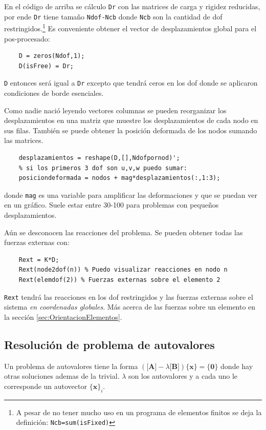 \documentclass[11pt, a4paper,titlepage]{article}
\newcommand{\Mme}[1]{\boldsymbol{[}\mathbf{#1} \boldsymbol{]}}
\newcommand{\Cme}[1]{\boldsymbol{\{ }\mathbf{#1} \boldsymbol{\}} }
\begin{document}
En el código de arriba se cálculo \texttt{Dr} con las matrices de carga y rigidez reducidas, por ende \texttt{Dr} tiene tamaño \texttt{Ndof-Ncb} donde \texttt{Ncb} son la cantidad de dof restringidos.\footnote{A pesar de no tener mucho uso en un programa de elementos finitos se deja la definición: \texttt{Ncb=sum(isFixed)}} Es conveniente obtener el vector de desplazamientos global para el pos-procesado:

\begin{verbatim}
    D = zeros(Ndof,1);
    D(isFree) = Dr;
\end{verbatim}
\texttt{D} entonces será igual a \texttt{Dr} excepto que tendrá ceros en los dof donde se aplicaron condiciones de borde esenciales.

Como nadie nació leyendo vectores columnas se pueden reorganizar los desplazamientos en una matriz que muestre los desplazamientos de cada nodo en sus filas. También se puede obtener la posición deformada de los nodos sumando las matrices.
\begin{verbatim}
    desplazamientos = reshape(D,[],Ndofpornod)';
    % si los primeros 3 dof son u,v,w puedo sumar:
    posiciondeformada = nodos + mag*desplazamientos(:,1:3); 
\end{verbatim}
 donde \texttt{mag} es una variable para amplificar las deformaciones y que se puedan ver en un gráfico. Suele estar entre 30-100 para problemas con pequeños desplazamientos.

Aún se desconocen las reacciones del problema. Se pueden obtener todas las fuerzas externas con:
\begin{verbatim}
    Rext = K*D;
    Rext(node2dof(n)) % Puedo visualizar reacciones en nodo n
    Rext(elemdof(2)) % Fuerzas externas sobre el elemento 2
\end{verbatim}
\texttt{Rext} tendrá las reacciones en los dof restringidos y las fuerzas externas sobre el sistema \textit{en coordenadas globales}. Más acerca de las fuerzas sobre un elemento en la sección \ref{sec:OrientacionElementos}.

\subsection*{Resolución de problema de autovalores}
Un problema de autovalores tiene la forma $\left(\Mme{A} - \lambda \Mme{B} \right) \Cme{x} = \Cme{0}$ donde hay otras soluciones ademas de la trivial. $\lambda$ son los autovalores y a cada uno le corresponde un autovector $\Cme{x}_i$.
\end{document}
